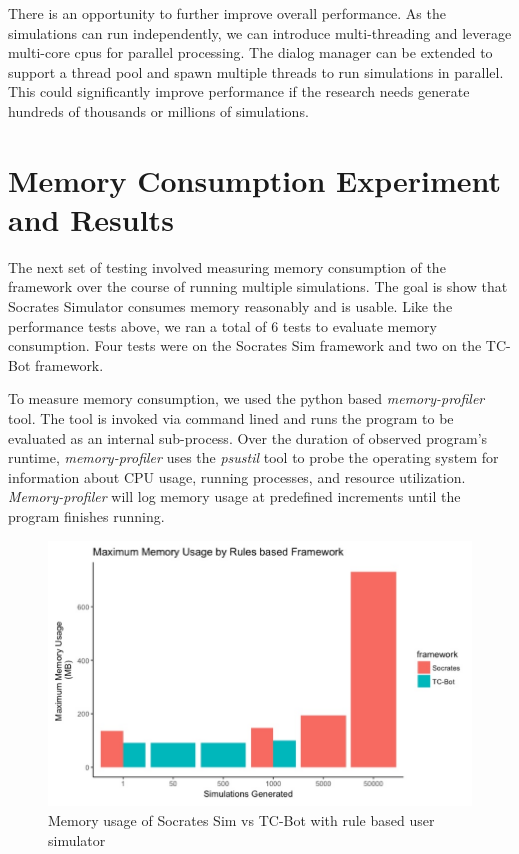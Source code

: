  There is an opportunity to further improve overall performance. As the simulations can run independently, we can introduce multi-threading and leverage multi-core cpus for parallel processing. The dialog manager can be extended to support a thread pool and spawn multiple threads to run simulations in parallel. This could significantly improve performance if the research needs generate hundreds of thousands or millions of simulations.  

\clearpage 
\section{Memory Consumption Experiment and Results}

The next set of testing involved measuring memory consumption of the framework over the course of running multiple simulations. The goal is show that Socrates Simulator consumes memory reasonably and is usable. Like the performance tests above, we ran a total of 6 tests to evaluate memory consumption. Four tests were on the Socrates Sim framework and two on the TC-Bot framework.

To measure memory consumption, we used the python based \textit{memory-profiler} tool. The tool is invoked via command lined and runs the program to be evaluated as an internal sub-process. Over the duration of observed program's runtime, \textit{memory-profiler} uses the \textit{psustil} tool to probe the operating system for information about CPU usage, running processes, and resource utilization. \textit{Memory-profiler} will log memory usage at predefined increments until the program finishes running. 

\begin{figure}[h!]
	\label{fig:mem_usage_rules}
	\includegraphics[width=\linewidth]{diagrams/mem_usage_rules.jpeg}
	\caption{ Memory usage of Socrates Sim vs TC-Bot with rule based user simulator}
\end{figure}

